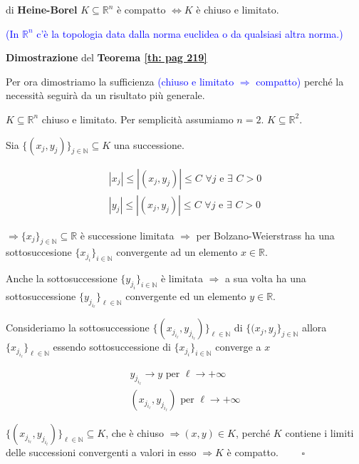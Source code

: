 	
\begin{theorem} di \textbf{Heine-Borel}
	\label{th: pag 219}
	$K \subseteq \mathbb{R}^n$ è compatto $\Leftrightarrow K$ è chiuso e limitato. 
	
	\textcolor{blue}{(In $\mathbb{R}^n$ c'è la topologia data dalla norma euclidea o da qualsiasi altra norma.)}
\end{theorem}
	
	
\begin{dembar}
	\textbf{Dimostrazione} del \textbf{Teorema \ref{th: pag 219}}
	
	Per ora dimostriamo la sufficienza \textcolor{blue}{(chiuso e limitato $\Rightarrow$ compatto)} perché la necessità seguirà da un risultato più generale.
	
	$K \subseteq \mathbb{R}^n$ chiuso e limitato. Per semplicità assumiamo $n=2$. 	$K \subseteq \mathbb{R}^2$. 
	
	Sia $\{(x_j,y_j)\}_{j \in \mathbb{N}} \subseteq K$ una successione.
	
	\begin{gather*} 
		|x_j|\leq |(x_j,y_j)|\leq C \,\, \forall j \text{ e } \exists\,\, C >0
		\\
		|y_j|\leq |(x_j,y_j)|\leq C \,\, \forall j \text{ e } \exists\,\, C >0
	\end{gather*}
	
	$\Rightarrow \{x_j\}_{j\in\mathbb{N}} \subseteq \mathbb{R}$ è successione limitata $\Rightarrow$ per Bolzano-Weierstrass ha una sottosuccesione  $\{x_{j_i}\}_{i\in\mathbb{N}}$ convergente ad un elemento $x \in \mathbb{R}$. 
	
	Anche la sottosuccessione $\{y_{j_i}\}_{i\in\mathbb{N}}$ è limitata $\Rightarrow$ a sua volta ha una sottosuccessione $\{y_{j_{i_\ell}}\}_{\ell\in\mathbb{N}}$ convergente ed un elemento $y \in \mathbb{R}$.
	
	Consideriamo la sottosuccessione $\{(x_{j_{i_\ell}},y_{j_{i_\ell}})\}_{\ell \in \mathbb{N}}$ di $\{(x_j,y_j\}_{j\in\mathbb{N}}$ allora $\{x_{j_{i_\ell}}\}_{\ell \in \mathbb{N}}$ essendo sottosuccessione di $\{x_{j_i}\}_{i\in\mathbb{N}}$ converge a $x$
	
	\begin{gather*} 
		y_{j_{i_\ell}}\rightarrow y \text{ per } \ell\rightarrow+\infty
		\\
		(x_{j_{i_\ell}},y_{j_{i_\ell}}) \text{ per } \ell\rightarrow+\infty
	\end{gather*}
	
		$\{(x_{j_{i_\ell}},y_{j_{i_\ell}})\}_{\ell\in \mathbb{N}} \subseteq K$, che è chiuso $\Rightarrow (x,y)\in K$, perché $K$ contiene i limiti delle successioni convergenti a valori in esso $\Rightarrow K$ è compatto. $\qquad \square$
\end{dembar}


